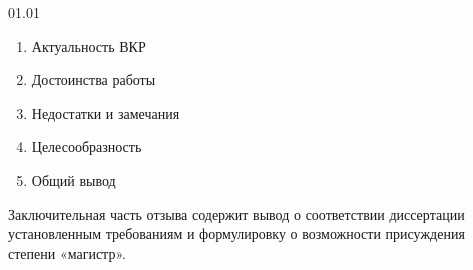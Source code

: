 \documentclass[../document.tex]{subfiles}
\begin{document}
    \begin{review}{}{01.01}
        \begin{enumerate}
            \item Актуальность ВКР
            \item Достоинства работы
            \item Недостатки и замечания
            \item Целесообразность
            \item Общий вывод
        \end{enumerate}
        Заключительная часть отзыва содержит вывод о соответствии диссертации установленным
        требованиям и формулировку о возможности присуждения степени «магистр».
    \end{review}
\end{document}
